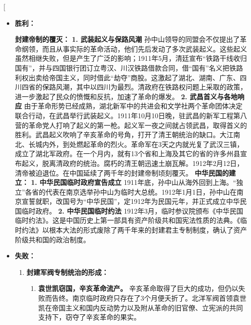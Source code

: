 \begin{enumerate}
	\ans[
		\begin{itemize}
		\item {\textbf{胜利：}\par
			\textbf{封建帝制的覆灭：}
				\textbf{1. 武装起义与保路风潮} 孙中山领导的同盟会不仅提出了革命纲领，而且从事实际的革命活动，他们先后发动了多次武装起义。这些起义虽然相继失败，但是产生了广泛的影响；1911年5月，清廷宣布“铁路干线收归国有”，并与四国银行团订立粤汉、川汉铁路借款合同，借“国有”名义把铁路利权出卖给帝国主义，同时借此“劫夺”商股。这激起了湖北、湖南、广东、四川四省的保路风潮，其中以四川为最烈。清政府在铁路权问题上采取的政策，进一步激起了民众的愤慨和反抗，加速了革命的爆发。
				\textbf{2. 武昌首义与各地响应} 由于革命形势已经成熟，湖北新军中的共进会和文学社两个革命团体决定联合行动，在武昌举行武装起义。1911年10月10日晚，驻武昌的新军工程第八营的革命党人打响了起义的第一枪。起义军一夜之间就占领武昌，取得首义的胜利。武昌起义吹响了辛亥革命的号角，打开了清王朝统治的缺口。大江南北、长城内外，到处燃起革命的烈火。革命军在3天之内就光复了武汉三镇，成立了湖北军政府。在一个月内，就有13个省和上海及其它的省的许多州县宣布起义，脱离清政府的统治。腐朽的清王朝迅速土崩瓦解。1912年2月12日，清帝被迫退位。在中国延续了两千年的封建帝制顷刻覆灭。
			\textbf{中华民国的建立：}
				\textbf{1. 中华民国临时政府宣告成立} 1911年底，孙中山从海外回到上海。“独立”各省的代表在南京选举孙中山为临时大总统。1912年1月1日，孙中山在南京宣誓就职，改国号为“中华民国”，定1912年为民国元年，并正式成立中华民国临时政府。
				\textbf{2. 中华民国临时约法} 1912年3月，临时参议院颁布《中华民国临时约法》。这是中国历史上第一部具有资产阶级共和国宪法性质的法典。《临时约法》以根本大法的形式废除了两千年来的封建君主专制制度，确认了资产阶级共和国的政治制度。
		}
		\item {\textbf{失败：}\par \begin{enumerate}
			\item {\textbf{封建军阀专制统治的形成：} \begin{enumerate}
				\item {\textbf{袁世凯窃国，辛亥革命流产。} 辛亥革命取得了巨大的成功，但仍以失败而告终。南京临时政府只存在了3个月便夭折了。北洋军阀首领袁世凯在帝国主义和国内反动势力以及附从革命的旧官僚、立宪派的共同支持下，窃夺了辛亥革命的果实。\par}

\end{enumerate}}
\end{enumerate}}
\end{itemize}
\end{enumerate}
